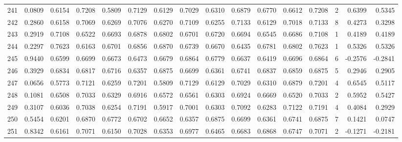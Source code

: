 \begin{tabular}{lrrrrrrrrrrrrrrr}
241 &      0.0809 &  0.6154 &  0.7208 &  0.5809 &  0.7129 &  0.6129 &  0.7029 &  0.6310 &  0.6879 &  0.6770 &   0.6612 &     0.7208 &      2 &                    0.6399 &                     0.5345 \\
242 &      0.2860 &  0.6158 &  0.7069 &  0.6269 &  0.7076 &  0.6270 &  0.7109 &  0.6255 &  0.7133 &  0.6129 &   0.7018 &     0.7133 &      8 &                    0.4273 &                     0.3298 \\
243 &      0.2919 &  0.7108 &  0.6522 &  0.6693 &  0.6878 &  0.6802 &  0.6701 &  0.6720 &  0.6694 &  0.6545 &   0.6686 &     0.7108 &      1 &                    0.4189 &                     0.4189 \\
244 &      0.2297 &  0.7623 &  0.6163 &  0.6701 &  0.6856 &  0.6870 &  0.6739 &  0.6670 &  0.6435 &  0.6781 &   0.6802 &     0.7623 &      1 &                    0.5326 &                     0.5326 \\
245 &      0.9440 &  0.6599 &  0.6699 &  0.6673 &  0.6473 &  0.6679 &  0.6864 &  0.6779 &  0.6637 &  0.6419 &   0.6696 &     0.6864 &      6 &                   -0.2576 &                    -0.2841 \\
246 &      0.3929 &  0.6834 &  0.6817 &  0.6716 &  0.6357 &  0.6875 &  0.6699 &  0.6361 &  0.6741 &  0.6837 &   0.6859 &     0.6875 &      5 &                    0.2946 &                     0.2905 \\
247 &      0.0656 &  0.5773 &  0.7121 &  0.6259 &  0.7201 &  0.5809 &  0.7129 &  0.6129 &  0.7029 &  0.6310 &   0.6879 &     0.7201 &      4 &                    0.6545 &                     0.5117 \\
248 &      0.1081 &  0.6508 &  0.7033 &  0.6329 &  0.6916 &  0.6572 &  0.6561 &  0.6303 &  0.6924 &  0.6669 &   0.6520 &     0.7033 &      2 &                    0.5952 &                     0.5427 \\
249 &      0.3107 &  0.6036 &  0.7038 &  0.6254 &  0.7191 &  0.5917 &  0.7001 &  0.6303 &  0.7092 &  0.6283 &   0.7122 &     0.7191 &      4 &                    0.4084 &                     0.2929 \\
250 &      0.5454 &  0.6201 &  0.6870 &  0.6772 &  0.6702 &  0.6652 &  0.6357 &  0.6875 &  0.6699 &  0.6361 &   0.6741 &     0.6875 &      7 &                    0.1421 &                     0.0747 \\
251 &      0.8342 &  0.6161 &  0.7071 &  0.6150 &  0.7028 &  0.6353 &  0.6977 &  0.6465 &  0.6683 &  0.6868 &   0.6747 &     0.7071 &      2 &                   -0.1271 &                    -0.2181 \\

\end{tabular}
